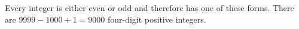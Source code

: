 Every integer is either even or odd and therefore has one of these forms. There are $9999-1000+1=\boxed{9000}$ four-digit positive integers.
